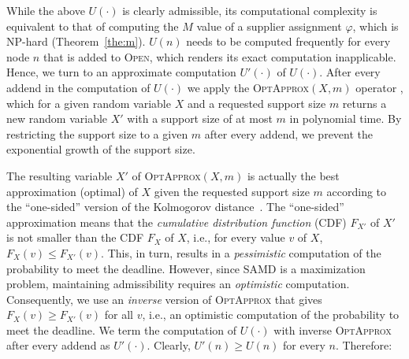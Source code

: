 \documentclass[letterpaper]{article} %
\newcommand{\samd}{\ac{SAMD}\xspace}
\newcommand{\sampling}{\textsc{Sampling}\xspace}
\newcommand{\open}{\textsc{Open}\xspace}
\newcommand{\optapprox}{\textsc{OptApprox}\xspace}
\newcommand\Liat[1]{\nb{\textbf{Liat:}}{red}{#1}}
\newcommand\Roni[1]{\nb{\textbf{Roni:}}{blue}{#1}}
\begin{document}

While the above $U(\cdot)$ is clearly admissible, its computational complexity is equivalent to that of computing the $M$ value of a supplier assignment $\varphi$, which is NP-hard (Theorem~\ref{the:m}). 
$U(n)$ needs to be computed frequently for every node $n$ that is added to \open, which renders its exact computation inapplicable. Hence, we turn to an approximate computation $U'(\cdot)$ of $U(\cdot)$.
After every addend in the computation of $U(\cdot)$ we apply the \optapprox$(X,m)$ operator \cite{cohen2018optimal}, which for a given random variable $X$ and a requested support size $m$ returns a new random variable $X'$ with a support size of at most $m$ in polynomial time. By restricting the support size to a given $m$ after every addend, we prevent the exponential growth of the support size.

The resulting variable $X'$ of \optapprox$(X,m)$ is actually the best approximation (optimal) of $X$ given the requested support size $m$ according to the ``one-sided'' version of the Kolmogorov distance~\cite{lilliefors1967kolmogorov}. The ``one-sided'' approximation means that the \emph{cumulative distribution function} (CDF) $F_{X'}$ of $X'$ is not smaller than the CDF $F_{X}$ of $X$, i.e., for every value $v$ of $X$, $F_{X}(v)\leq F_{X'}(v)$. This, in turn, results in a \emph{pessimistic} computation of the probability to meet the deadline. However, since \samd is a maximization problem, maintaining admissibility requires an \emph{optimistic} computation. Consequently, we use an \emph{inverse} version of \optapprox that gives $F_{X}(v)\geq F_{X'}(v)$ for all $v$, i.e., an optimistic computation of the probability to meet the deadline. We term the computation of $U(\cdot)$ with inverse \optapprox after every addend as $U'(\cdot)$. 
Clearly, $U'(n)\geq U(n)$ for every $n$. Therefore:

\end{document}

